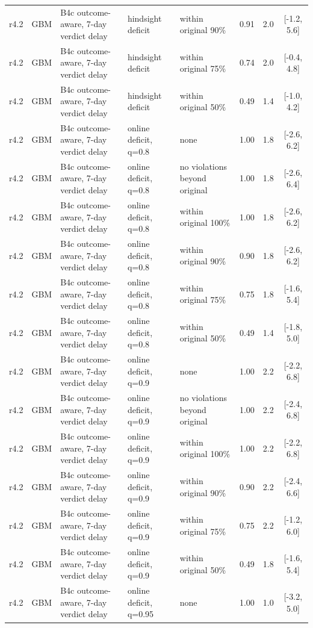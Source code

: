 \begin{longtable}{lllp{4.2cm}p{3.4cm}ccc}
r4.2 & GBM & B4c outcome-aware, 7-day verdict delay & hindsight deficit & within original 90\% & 0.91 & 2.0 & [-1.2, 5.6] \\
r4.2 & GBM & B4c outcome-aware, 7-day verdict delay & hindsight deficit & within original 75\% & 0.74 & 2.0 & [-0.4, 4.8] \\
r4.2 & GBM & B4c outcome-aware, 7-day verdict delay & hindsight deficit & within original 50\% & 0.49 & 1.4 & [-1.0, 4.2] \\
r4.2 & GBM & B4c outcome-aware, 7-day verdict delay & online deficit, q=0.8 & none & 1.00 & 1.8 & [-2.6, 6.2] \\
r4.2 & GBM & B4c outcome-aware, 7-day verdict delay & online deficit, q=0.8 & no violations beyond original & 1.00 & 1.8 & [-2.6, 6.4] \\
r4.2 & GBM & B4c outcome-aware, 7-day verdict delay & online deficit, q=0.8 & within original 100\% & 1.00 & 1.8 & [-2.6, 6.2] \\
r4.2 & GBM & B4c outcome-aware, 7-day verdict delay & online deficit, q=0.8 & within original 90\% & 0.90 & 1.8 & [-2.6, 6.2] \\
r4.2 & GBM & B4c outcome-aware, 7-day verdict delay & online deficit, q=0.8 & within original 75\% & 0.75 & 1.8 & [-1.6, 5.4] \\
r4.2 & GBM & B4c outcome-aware, 7-day verdict delay & online deficit, q=0.8 & within original 50\% & 0.49 & 1.4 & [-1.8, 5.0] \\
r4.2 & GBM & B4c outcome-aware, 7-day verdict delay & online deficit, q=0.9 & none & 1.00 & 2.2 & [-2.2, 6.8] \\
r4.2 & GBM & B4c outcome-aware, 7-day verdict delay & online deficit, q=0.9 & no violations beyond original & 1.00 & 2.2 & [-2.4, 6.8] \\
r4.2 & GBM & B4c outcome-aware, 7-day verdict delay & online deficit, q=0.9 & within original 100\% & 1.00 & 2.2 & [-2.2, 6.8] \\
r4.2 & GBM & B4c outcome-aware, 7-day verdict delay & online deficit, q=0.9 & within original 90\% & 0.90 & 2.2 & [-2.4, 6.6] \\
r4.2 & GBM & B4c outcome-aware, 7-day verdict delay & online deficit, q=0.9 & within original 75\% & 0.75 & 2.2 & [-1.2, 6.0] \\
r4.2 & GBM & B4c outcome-aware, 7-day verdict delay & online deficit, q=0.9 & within original 50\% & 0.49 & 1.8 & [-1.6, 5.4] \\
r4.2 & GBM & B4c outcome-aware, 7-day verdict delay & online deficit, q=0.95 & none & 1.00 & 1.0 & [-3.2, 5.0] \\

\end{longtable}
